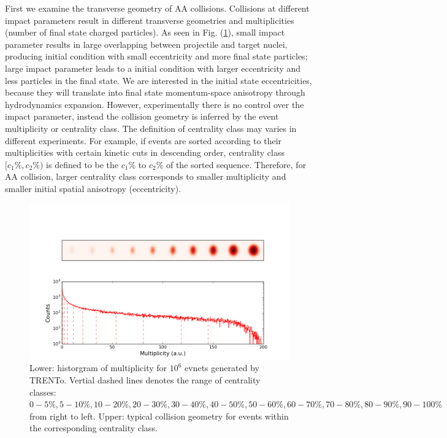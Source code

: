 \documentclass[aps,prl,twocolumn,groupedaddress]{revtex4-1}
\begin{document}
	First we examine the transverse geometry of AA collisions. Collisions at different impact parameters result in different transverse geometries and multiplicities (number of final state charged particles). 
	As seen in Fig. (\ref{centrality}), small impact parameter results in large overlapping between projectile and target nuclei, producing initial condition with small eccentricity and more final state particles; large impact parameter leads to a initial condition with larger eccentricity and less particles in the final state. 
	We are interested in the initial state eccentricities, because they will translate into final state momentum-space anisotropy through hydrodynamics expansion.
	However, experimentally there is no control over the impact parameter, instead the collision geometry is inferred by the event multiplicity or centrality class.
	The definition of centrality class may varies in different experiments.
	For example, if events are sorted according to their multiplicities with certain kinetic cuts in descending order, centrality class $[c_1\%, c_2\%)$ is defined to be the $c_1\%$ to $c_2\%$ of the sorted sequence.
	Therefore, for AA collision, larger centrality class corresponds to smaller multiplicity and smaller initial spatial anisotropy (eccentricity).
	\begin{center}
	\begin{figure}
	\includegraphics[width=\columnwidth]{pics/centrality.png}
	\caption{Lower: historgram of multiplicity for $10^6$ evnets generated by TRENTo. Vertial dashed lines denotes the range of centrality classes: $0 - 5\%, 5 - 10\%, 10 - 20\%, 20 - 30\%, 30 - 40\%, 40 - 50\%, 50 - 60\%, 60 - 70\%, 70 - 80\%, 80 - 90\%, 90 - 100\%$ from right to left. Upper: typical collision geometry for events within the corresponding centrality class.}\label{centrality}
	\end{figure}
	\end{center}		
	
\end{document}
